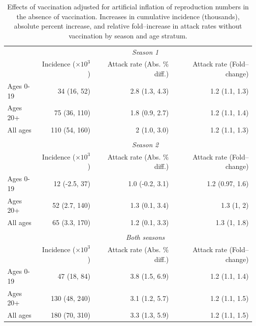 \begin{table}[htbp]
	\caption[Adjusted estimates of predicted incidence and attack rates in the absence of vaccination.]{Effects of vaccination adjusted for artificial inflation of reproduction numbers in the absence of vaccination. Increases in cumulative incidence (thousands), absolute percent increase, and relative fold--increase in attack rates without vaccination by season and age stratum.}
	\label{tab:flu_novacc_adj}
	\centering\footnotesize
	\begin{tabular}{lrrr}
		\hline
		&\multicolumn{3}{c}{\textit{Season 1}}\\
		\cmidrule{2-4} 
		& Incidence ($ \times10^3 $) & Attack rate (Abs. \% diff.) & Attack rate (Fold--change) \\
		\hline
		Ages 0-19 & 34 (16, 52) & 2.8 (1.3, 4.3) & 1.2 (1.1, 1.3)\\
		Ages 20+ & 75 (36, 110) & 1.8 (0.9, 2.7) & 1.2 (1.1, 1.4)\\
		All ages & 110 (54, 160) & 2 (1.0, 3.0) & 1.2 (1.1, 1.3)\\
		\hline
		&&&\\
		&\multicolumn{3}{c}{\textit{Season 2}}\\
		\cmidrule{2-4} 
		&Incidence ($ \times10^3 $) & Attack rate (Abs. \% diff.) & Attack rate (Fold--change) \\
		\hline
		Ages 0-19 & 12 (-2.5, 37) & 1.0 (-0.2, 3.1) & 1.2 (0.97, 1.6)\\
		Ages 20+ & 52 (2.7, 140) & 1.3 (0.1, 3.4) & 1.3 (1, 2)\\
		All ages & 65 (3.3, 170) & 1.2 (0.1, 3.3) & 1.3 (1, 1.8)\\
		\hline
		&&&\\
		&\multicolumn{3}{c}{\textit{Both seasons}}\\
		\cmidrule{2-4} 
		&Incidence ($ \times10^3 $)& Attack rate (Abs. \% diff.) & Attack rate (Fold--change) \\
		\hline
		Ages 0-19 & 47 (18, 84) & 3.8 (1.5, 6.9) & 1.2 (1.1, 1.4)\\
		Ages 20+ & 130 (48, 240) & 3.1 (1.2, 5.7) & 1.2 (1.1, 1.5)\\
		All ages & 180 (70, 310) & 3.3 (1.3, 5.9) & 1.2 (1.1, 1.5)\\
		\hline
	\end{tabular}
\end{table}

